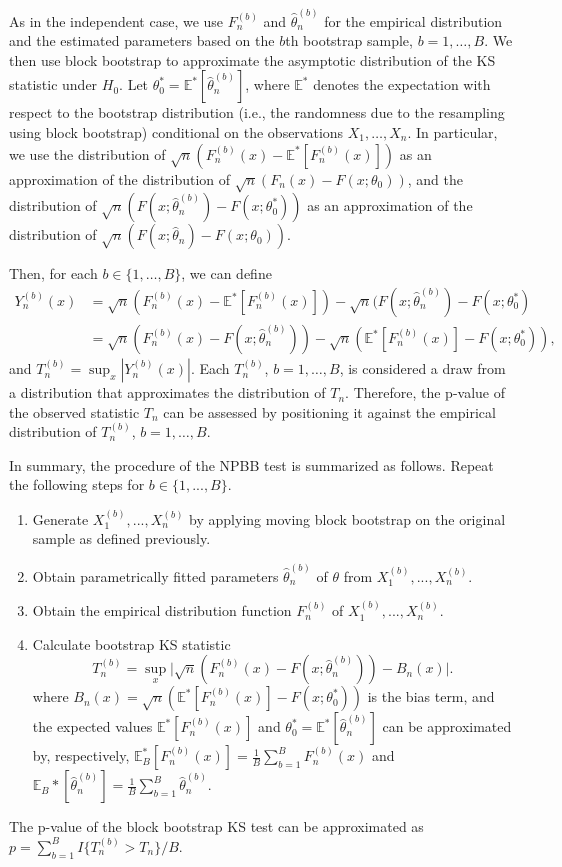 \documentclass[APA,Times1COL]{WileyNJDv5} %
\begin{document}
As in the independent case,
we use $F^{(b)}_n$ and $\hat\theta^{(b)}_n$ for the empirical distribution and
the estimated parameters based on the $b$th bootstrap sample,
$b = 1, \ldots, B$.
We then use block bootstrap to approximate the asymptotic distribution of
the KS statistic under $H_0$. Let
$\theta_0^* = \mathbb{E}^{*}[\hat\theta^{(b)}_n]$, where
$\mathbb{E}^{*}$ denotes the expectation with respect to the
bootstrap distribution (i.e., the randomness due
to the resampling using block bootstrap) conditional on the observations 
$X_1, \dots, X_n$. In particular, we
use the distribution of $\sqrt{n}(F^{(b)}_n(x) - \mathbb{E}^{*}[F^{(b)}_n(x)])$
as an approximation of the distribution of
$\sqrt{n}(F_n(x) - F(x; \theta_0))$, and the distribution of 
$\sqrt{n}(F(x; \hat\theta^{(b)}_n) - F(x; \theta_0^*))$ as
an approximation of the distribution of 
$\sqrt{n}(F(x; \hat\theta_n) - F(x; \theta_0))$.


Then, for each $b \in \{1, \dots, B\}$, we can define
\begin{align*}
  Y^{(b)}_n(x) &= \sqrt{n}(F^{(b)}_n(x) - \mathbb{E}^{*}[F^{(b)}_n(x)]) - 
             \sqrt{n}(F(x; \hat\theta^{(b)}_n) - F(x; \theta_0^*) \\
           &= \sqrt{n}(F^{(b)}_n(x) - F(x; \hat\theta^{(b)}_n)) -
             \sqrt{n}(\mathbb{E}^{*}[F^{(b)}_n(x)] - F(x; \theta_0^*)),
\end{align*}
and $T^{(b)}_n = \sup_x|Y^{(b)}_n(x)|$. Each $T_n^{(b)}$,
$b =1, \ldots, B$, is considered a draw from a distribution that approximates
the distribution of $T_n$. Therefore, the p-value of the observed statistic
$T_n$ can be assessed by positioning it against the empirical distribution of
$T_n^{(b)}$, $b = 1, \ldots, B$.


In summary, the procedure of the NPBB test is 
summarized as follows. Repeat the following steps for $b \in \{1, ..., B\}$.
\begin{enumerate}
\item
  Generate $X^{(b)}_1,...,X^{(b)}_n$ by applying moving block bootstrap 
  on the original sample as
  defined previously.
\item
  Obtain parametrically fitted parameters 
  $\hat\theta^{(b)}_n$ of $\theta$ from $X^{(b)}_1,...,X^{(b)}_n$.  
\item
  Obtain the empirical distribution function $F^{(b)}_n$ of
  $X^{(b)}_1,...,X^{(b)}_n$. 
\item
  Calculate bootstrap KS statistic
  \[
    T^{(b)}_n = \sup_x \Big\vert \sqrt{n}\left(F^{(b)}_n(x) 
    - F(x; \hat\theta^{(b)}_n)\right) - B_n(x) \Big\vert.
  \]
  where 
  $B_{n}(x) = \sqrt{n}(\mathbb{E}^{*}[F^{(b)}_n(x)] - 
  F(x; \theta_0^*))$ is the bias term, and
  the expected values $\mathbb{E}^{*}[F^{(b)}_n(x)]$ and
$\theta_0^* = \mathbb{E}^{*}[\hat\theta^{(b)}_n]$ can be
approximated by, respectively,
$\mathbb{E}_B^{*}[F^{(b)}_n(x)] = \frac{1}{B}\sum_{b = 1}^B F^{(b)}_n(x)$ and
$\mathbb{E}_B{*}[\hat\theta^{(b)}_n]  =  \frac{1}{B}\sum_{b = 1}^B\hat\theta^{(b)}_n$.
\end{enumerate}
The p-value of the block bootstrap KS test can be approximated
as $p = \sum_{b=1}^B I\{T^{(b)}_n > T_n\} / B$.
\end{document}

